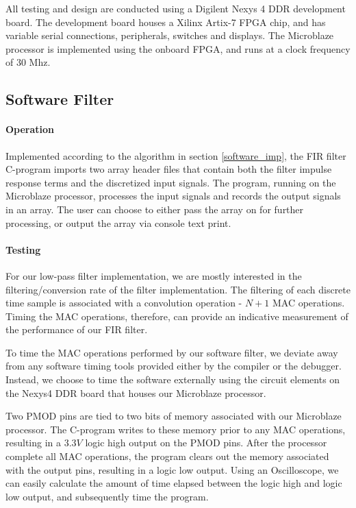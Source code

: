 \documentclass[conference]{IEEEtran}
\begin{document}
All testing and design are conducted using a Digilent Nexys\texttrademark{} 4 DDR development board. The development board houses a Xilinx\texttrademark{} Artix-7 FPGA chip, and has variable serial connections, peripherals, switches and displays. The Microblaze\textregistered{} processor is implemented using the onboard FPGA, and runs at a clock frequency of 30 Mhz.

\subsection{Software Filter} \label{software_test}

\paragraph{Operation} Implemented according to the algorithm in section \ref{software_imp}, the FIR filter C-program imports two array header files that contain both the filter impulse response terms and the discretized input signals. The program, running on the Microblaze\textregistered{} processor, processes the input signals and records the output signals in an array. The user can choose to either pass the array on for further processing, or output the array via console text print.

\paragraph{Testing} For our low-pass filter implementation, we are mostly interested in the filtering/conversion rate of the filter implementation. The filtering of each discrete time sample is associated with a convolution operation - $N+1$ MAC operations. Timing the MAC operations, therefore, can provide an indicative measurement of the performance of our FIR filter.

To time the MAC operations performed by our software filter, we deviate away from any software timing tools provided either by the compiler or the debugger. Instead, we choose to time the software externally using the circuit elements on the Nexys\texttrademark{}4 DDR board that houses our Microblaze\textregistered{} processor. 

Two PMOD pins are tied to two bits of memory associated with our Microblaze\textregistered{} processor. The C-program writes to these memory prior to any MAC operations, resulting in a $3.3V$ logic high output on the PMOD pins. After the processor complete all MAC operations, the program clears out the memory associated with the output pins, resulting in a logic low output. Using an Oscilloscope, we can easily calculate the amount of time elapsed between the logic high and logic low output, and subsequently time the program. 
\end{document}
